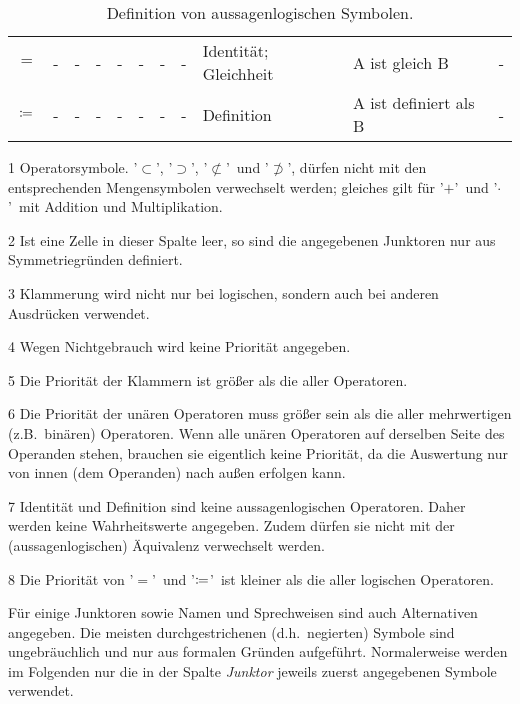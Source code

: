 \documentclass[english,ngerman,parskip=half,headsepline,footsepline]{scrreprt}
\makeatletter
\newcommand*{\textdh}{d.\@ h.\@}
\newcommand*{\textzB}{z.\@ B.\@}
\newcommand*{\clq}{'} %
\newcommand*{\crq}{'} %
\makeatother
\begin{document}
\begin{table}
\begin{threeparttable}
\begin{tabularx}{\linewidth-10.95pt}{c||c:cc:cccc|X:X|c|}
				$=$ &-&-&-&-&-&-&-& Identität; Gleichheit&A ist gleich B&-\\
				\tableline %
				$\coloneqq$ &-&-&-&-&-&-&-& Definition&A ist definiert als B&-\\
				\hline %
			\end{tabularx}
			\begin{tablenotes}
				\footnotesize
				\item[1] Operatorsymbole. \clq$\subset$\crq, \clq$\supset$\crq, \clq$\nsubset$\crq\ und \clq$\nsupset$\crq, dürfen nicht mit den entsprechenden Mengensymbolen verwechselt werden; gleiches gilt für \clq$+$\crq\ und \clq$\cdot$\crq\ mit Addition und Multiplikation.
				\item[2] Ist eine Zelle in dieser Spalte leer, so sind die angegebenen Junktoren nur aus Symmetriegründen definiert.
				\item[3] Klammerung wird nicht nur bei logischen, sondern auch bei anderen Ausdrücken verwendet.
				\item[4] Wegen Nichtgebrauch wird keine Priorität angegeben.
				\item[5] Die Priorität der Klammern ist größer als die aller Operatoren.
				\item[6] Die Priorität der unären Operatoren muss größer sein als die aller mehrwertigen (\textzB\  binären) Operatoren. Wenn alle unären Operatoren auf derselben Seite des Operanden stehen, brauchen sie eigentlich keine Priorität, da die Auswertung nur von innen (dem Operanden) nach außen erfolgen kann.
				\item[7] Identität und Definition sind keine aussagenlogischen Operatoren. Daher werden keine Wahrheitswerte angegeben. Zudem dürfen sie nicht mit der (aussagenlogischen) Äquivalenz verwechselt werden.
				\item[8] Die Priorität von \clq$=$\crq\ und \clq$\coloneqq$\crq\ ist kleiner als die aller logischen Operatoren.
			\end{tablenotes}
			\caption{Definition von aussagenlogischen Symbolen.}
			\label{tab:Symbole}
		\end{threeparttable}
	\end{table}

	Für einige Junktoren sowie Namen und Sprechweisen sind auch Alternativen angegeben. Die meisten durchgestrichenen (\textdh\ negierten) Symbole sind ungebräuchlich und nur aus formalen Gründen aufgeführt. Normalerweise werden im Folgenden nur die in der Spalte \emph{Junktor} jeweils zuerst angegebenen Symbole verwendet.
\end{document}
